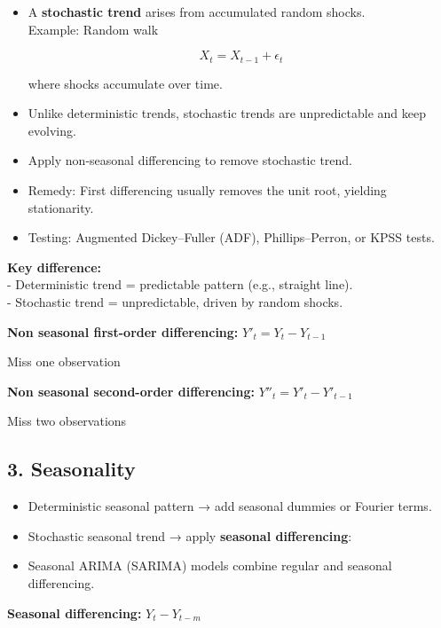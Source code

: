 \documentclass[
  11pt,
  a4paper,
]{report}
\begin{document}
\begin{itemize}
\item
  A \textbf{stochastic trend} arises from accumulated random shocks.\\
  Example: Random walk

  \[X_t = X_{t-1} + \epsilon_t\]

  where shocks accumulate over time.\\
\item
  Unlike deterministic trends, stochastic trends are unpredictable and
  keep evolving.\\
\item
  Apply non-seasonal differencing to remove stochastic trend.
\item
  Remedy: First differencing usually removes the unit root, yielding
  stationarity.\\
\item
  Testing: Augmented Dickey--Fuller (ADF), Phillips--Perron, or KPSS
  tests.
\end{itemize}

\textbf{Key difference:}\\
- Deterministic trend = predictable pattern (e.g., straight line).\\
- Stochastic trend = unpredictable, driven by random shocks.

\textbf{Non seasonal first-order differencing:} \(Y'_t=Y_t - Y_{t-1}\)

Miss one observation

\textbf{Non seasonal second-order differencing:}
\(Y''_t=Y'_t - Y'_{t-1}\)

Miss two observations

\subsection{3. Seasonality}\label{seasonality}

\begin{itemize}
\item
  Deterministic seasonal pattern → add seasonal dummies or Fourier
  terms.\\
\item
  Stochastic seasonal trend → apply \textbf{seasonal differencing}:
\item
  Seasonal ARIMA (SARIMA) models combine regular and seasonal
  differencing.
\end{itemize}

\textbf{Seasonal differencing:} \(Y_t - Y_{t-m}\)
\end{document}
